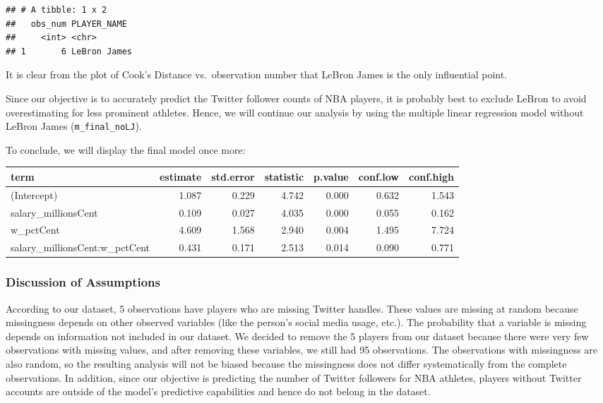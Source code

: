 \documentclass[]{article}
\newenvironment{Shaded}{\begin{snugshade}}{\end{snugshade}}
\newcommand{\DataTypeTok}[1]{\textcolor[rgb]{0.13,0.29,0.53}{#1}}
\newcommand{\DecValTok}[1]{\textcolor[rgb]{0.00,0.00,0.81}{#1}}
\newcommand{\KeywordTok}[1]{\textcolor[rgb]{0.13,0.29,0.53}{\textbf{#1}}}
\newcommand{\NormalTok}[1]{#1}
\newcommand{\OperatorTok}[1]{\textcolor[rgb]{0.81,0.36,0.00}{\textbf{#1}}}
\newcommand{\OtherTok}[1]{\textcolor[rgb]{0.56,0.35,0.01}{#1}}
\newcommand{\StringTok}[1]{\textcolor[rgb]{0.31,0.60,0.02}{#1}}
\begin{document}
\begin{verbatim}
## # A tibble: 1 x 2
##   obs_num PLAYER_NAME 
##     <int> <chr>       
## 1       6 LeBron James
\end{verbatim}

It is clear from the plot of Cook's Distance vs.~observation number that
LeBron James is the only influential point.

Since our objective is to accurately predict the Twitter follower counts
of NBA players, it is probably best to exclude LeBron to avoid
overestimating for less prominent athletes. Hence, we will continue our
analysis by using the multiple linear regression model without LeBron
James (\texttt{m\_final\_noLJ}).

To conclude, we will display the final model once more:

\begin{Shaded}
\end{Shaded}

\begin{longtable}[]{@{}lrrrrrr@{}}
\toprule
term & estimate & std.error & statistic & p.value & conf.low &
conf.high\tabularnewline
\midrule
\endhead
(Intercept) & 1.087 & 0.229 & 4.742 & 0.000 & 0.632 &
1.543\tabularnewline
salary\_millionsCent & 0.109 & 0.027 & 4.035 & 0.000 & 0.055 &
0.162\tabularnewline
w\_pctCent & 4.609 & 1.568 & 2.940 & 0.004 & 1.495 &
7.724\tabularnewline
salary\_millionsCent:w\_pctCent & 0.431 & 0.171 & 2.513 & 0.014 & 0.090
& 0.771\tabularnewline
\bottomrule
\end{longtable}

\hypertarget{discussion-of-assumptions}{%
\subsubsection{Discussion of
Assumptions}\label{discussion-of-assumptions}}

According to our dataset, 5 observations have players who are missing
Twitter handles. These values are missing at random because missingness
depends on other observed variables (like the person's social media
usage, etc.). The probability that a variable is missing depends on
information not included in our dataset. We decided to remove the 5
players from our dataset because there were very few observations with
missing values, and after removing these variables, we still had 95
observations. The observations with missingness are also random, so the
resulting analysis will not be biased because the missingness does not
differ systematically from the complete observations. In addition, since
our objective is predicting the number of Twitter followers for NBA
athletes, players without Twitter accounts are outside of the model's
predictive capabilities and hence do not belong in the dataset.
\end{document}
